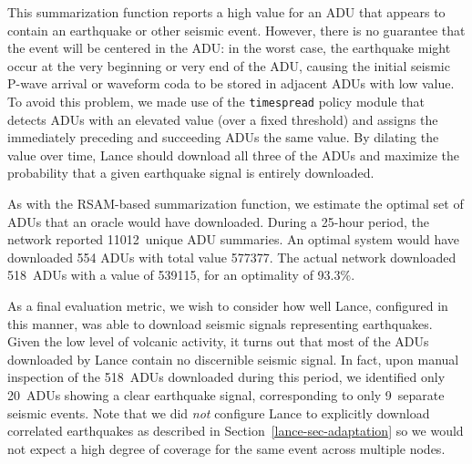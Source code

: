 This summarization function reports a high value for an ADU that appears to
contain an earthquake or other seismic event. However, there is no guarantee
that the event will be centered in the ADU: in the worst case, the earthquake
might occur at the very beginning or very end of the ADU, causing the initial
seismic P-wave arrival or waveform coda to be stored in adjacent ADUs with
low value. To avoid this problem, we made use of the \texttt{timespread}
policy module that detects ADUs with an elevated value (over a fixed
threshold) and assigns the immediately preceding and succeeding ADUs the same
value. By dilating the value over time, Lance should download all three of
the ADUs and maximize the probability that a given earthquake signal is
entirely downloaded.

As with the RSAM-based summarization function, we estimate the optimal set of
ADUs that an oracle would have downloaded. During a 25-hour period, the
network reported 11012~unique ADU summaries. An optimal system would have
downloaded 554 ADUs with total value 577377. The actual network downloaded
518~ADUs with a value of 539115, for an optimality of 93.3\%.

As a final evaluation metric, we wish to consider how well Lance, configured
in this manner, was able to download seismic signals representing
earthquakes. Given the low level of volcanic activity, it turns out that most
of the ADUs downloaded by Lance contain no discernible seismic signal. In
fact, upon manual inspection of the 518~ADUs downloaded during this period,
we identified only 20~ADUs showing a clear earthquake signal, corresponding
to only 9~separate seismic events. Note that we did \textit{not} configure
Lance to explicitly download correlated earthquakes as described in
Section~\ref{lance-sec-adaptation} so we would not expect a high degree of
coverage for the same event across multiple nodes.

